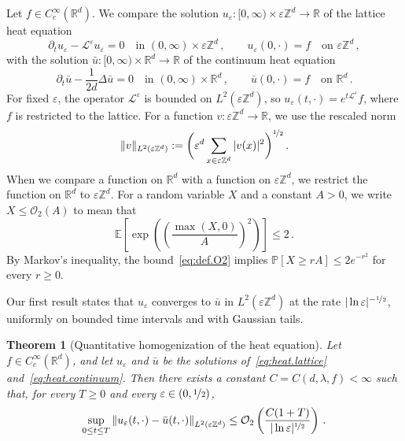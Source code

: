 \documentclass[11pt]{amsart}
\newtheorem{theorem}{Theorem}[section]
\numberwithin{equation}{section}
\newcommand{\Z}{\mathbb{Z}}
\newcommand{\R}{\mathbb{R}}
\newcommand{\E}{\mathbb{E}}
\newcommand{\PP}{\mathbb{P}}
\newcommand{\cO}{\mathcal{O}}
\newcommand{\eps}{\varepsilon}
\newcommand{\Leps}{\mathcal{L}^\varepsilon}
\newcommand{\nf}{\nicefrac}
\begin{document}
Let $f \in C^\infty_c(\R^d)$.
We compare the solution $u_\eps \colon [0, \infty) \times \eps \Z^d \to \R$ of the lattice heat equation
\begin{equation} \label{eq:heat.lattice}
    \partial_t u_\eps - \Leps u_\eps = 0 \quad \text{in } (0, \infty) \times \eps \Z^d\,, \qquad u_\eps(0, \cdot) = f \quad \text{on } \eps \Z^d\,,
\end{equation}
with the solution $\bar u \colon [0, \infty) \times \R^d \to \R$ of the continuum heat equation
\begin{equation} \label{eq:heat.continuum}
    \partial_t \bar u - \frac{1}{2d} \Delta \bar u = 0 \quad \text{in } (0, \infty) \times \R^d\,, \qquad \bar u(0, \cdot) = f \quad \text{on } \R^d\,.
\end{equation}
For fixed $\eps$, the operator $\Leps$ is bounded on $L^2(\eps \Z^d)$, so $u_\eps(t, \cdot) = e^{t \Leps} f$, where $f$ is restricted to the lattice.
For a function $v \colon \eps \Z^d \to \R$, we use the rescaled norm
\begin{equation} \label{eq:def.L2}
    \| v \|_{L^2(\eps \Z^d)} := \biggl( \eps^d \sum_{x \in \eps \Z^d} |v(x)|^2 \biggr)^{\nf12}\,.
\end{equation}
When we compare a function on $\R^d$ with a function on $\eps \Z^d$, we restrict the function on $\R^d$ to $\eps \Z^d$.
For a random variable $X$ and a constant $A > 0$, we write $X \leq \cO_2(A)$ to mean that
\begin{equation} \label{eq:def.O2}
    \E \left[ \exp \left( \left( \frac{\max(X, 0)}{A} \right)^2 \right) \right] \leq 2\,.
\end{equation}
By Markov's inequality, the bound~\eqref{eq:def.O2} implies $\PP[X \geq rA] \leq 2 e^{-r^2}$ for every $r \geq 0$.

Our first result states that $u_\eps$ converges to $\bar u$ in $L^2(\eps \Z^d)$ at the rate $|\ln \eps|^{-\nf12}$, uniformly on bounded time intervals and with Gaussian tails.

\begin{theorem}[Quantitative homogenization of the heat equation] \label{thm:main}
Let $f \in C^\infty_c(\R^d)$, and let $u_\eps$ and $\bar u$ be the solutions of~\eqref{eq:heat.lattice} and~\eqref{eq:heat.continuum}.
Then there exists a constant $C = C(d, \lambda, f) < \infty$ such that, for every $T \geq 0$ and every $\eps \in (0, \nf12)$,
\begin{equation} \label{eq:main}
    \sup_{0 \leq t \leq T} \left\| u_\eps(t, \cdot) - \bar u(t, \cdot) \right\|_{L^2(\eps \Z^d)} \leq \cO_2 \left( \frac{C (1 + T)}{|\ln \eps|^{\nf12}} \right)\,.
\end{equation}
\end{theorem}
\end{document}
